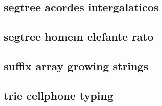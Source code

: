 \subsection{segtree acordes intergalaticos}
\raggedbottom
\hrulefill
\subsection{segtree homem elefante rato}
\raggedbottom
\hrulefill
\subsection{suffix array growing strings}
\raggedbottom
\hrulefill
\subsection{trie cellphone typing}
\raggedbottom
\hrulefill
\clearpage
